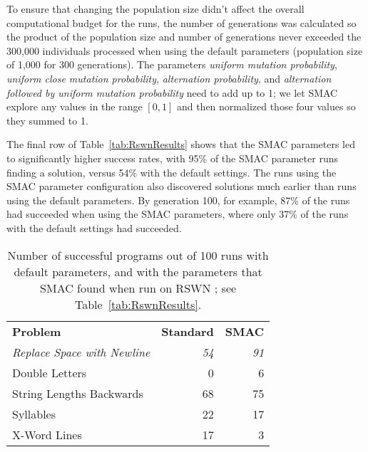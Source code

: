 To ensure that changing the population size didn't affect the overall
computational budget for the runs, the number of generations was calculated
so the product of the population size and
number of generations never exceeded the 300,000 individuals processed when using the default parameters
(population size of 1,000 for 300 generations).
The parameters \textit{uniform mutation probability}, \textit{uniform close
mutation probability}, \textit{alternation probability}, and \textit{alternation followed by uniform mutation probability} need to add up
to 1; we let SMAC explore any values in the range $[0, 1]$ and then normalized
those four values so they summed to 1.


The final row of Table~\ref{tab:RswnResults} shows that the SMAC parameters
led to significantly higher success rates, with 95\% of
the SMAC parameter runs finding a solution, versus 54\% with the default settings.
The runs using the SMAC
parameter configuration also discovered solutions much earlier than runs using
the default parameters. By generation 100, for example, 87\% of the runs had succeeded when using the SMAC parameters, 
where only 37\% of the runs with the default settings
had succeeded.

\begin{table}[t]
	\centering
	\caption{Number of successful programs out of 100 runs with default parameters, and with the parameters that SMAC found when run on RSWN
		; see Table~\ref{tab:RswnResults}.}
	\label{table:allResults}
	\begin{tabular}{l r r}
		\textbf{Problem} & \textbf{Standard} & \textbf{SMAC} \\
		\textit{Replace Space with Newline} & \textit{54} & \textit{91} \\
		Double Letters	& 0 & 6 \\
		String Lengths Backwards & 68 & 75 \\
		Syllables & 22 & 17 \\
		X-Word Lines & 17 & 3 \\
		\bottomrule
	\end{tabular}
\end{table}

